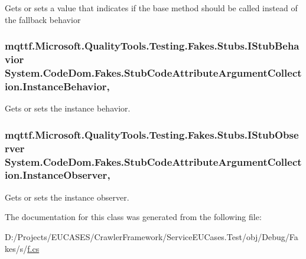 Gets or sets a value that indicates if the base method should be called instead of the fallback behavior

\hypertarget{class_system_1_1_code_dom_1_1_fakes_1_1_stub_code_attribute_argument_collection_a1ad32f83f49bfcaac0839331a8133d48}{
\subsubsection[{Instance\-Behavior}]{\setlength{\rightskip}{0pt plus 5cm}mqttf.\-Microsoft.\-Quality\-Tools.\-Testing.\-Fakes.\-Stubs.\-I\-Stub\-Behavior System.\-Code\-Dom.\-Fakes.\-Stub\-Code\-Attribute\-Argument\-Collection.\-Instance\-Behavior\hspace{0.3cm}{\ttfamily [get]}, {\ttfamily [set]}}}\label{class_system_1_1_code_dom_1_1_fakes_1_1_stub_code_attribute_argument_collection_a1ad32f83f49bfcaac0839331a8133d48}


Gets or sets the instance behavior.

\hypertarget{class_system_1_1_code_dom_1_1_fakes_1_1_stub_code_attribute_argument_collection_a0e5823ab0726b9dec6cbfaa63745d157}{
\subsubsection[{Instance\-Observer}]{\setlength{\rightskip}{0pt plus 5cm}mqttf.\-Microsoft.\-Quality\-Tools.\-Testing.\-Fakes.\-Stubs.\-I\-Stub\-Observer System.\-Code\-Dom.\-Fakes.\-Stub\-Code\-Attribute\-Argument\-Collection.\-Instance\-Observer\hspace{0.3cm}{\ttfamily [get]}, {\ttfamily [set]}}}\label{class_system_1_1_code_dom_1_1_fakes_1_1_stub_code_attribute_argument_collection_a0e5823ab0726b9dec6cbfaa63745d157}


Gets or sets the instance observer.



The documentation for this class was generated from the following file\-:\begin{DoxyCompactItemize}
\item 
D\-:/\-Projects/\-E\-U\-C\-A\-S\-E\-S/\-Crawler\-Framework/\-Service\-E\-U\-Cases.\-Test/obj/\-Debug/\-Fakes/s/\hyperlink{s_2f_8cs}{f.\-cs}\end{DoxyCompactItemize}
